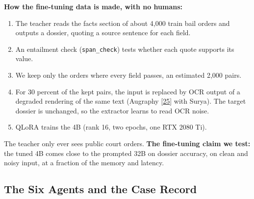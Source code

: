 \documentclass[10pt,a4paper]{article}
\newcommand{\st}[1]{\texttt{\small #1}}
\begin{document}
\textbf{How the fine-tuning data is made, with no humans:}

\begin{enumerate}
\item The teacher reads the facts section of about 4,000 train bail orders and outputs a dossier, quoting a source sentence for each field.
\item An entailment check (\st{span\_\allowbreak{}check}) tests whether each quote supports its value.
\item We keep only the orders where every field passes, an estimated 2,000 pairs.
\item For 30 percent of the kept pairs, the input is replaced by OCR output of a degraded rendering of the same text (Augraphy [\href{https://arxiv.org/abs/2208.14558}{25}] with Surya). The target dossier is unchanged, so the extractor learns to read OCR noise.
\item QLoRA trains the 4B (rank 16, two epochs, one RTX 2080 Ti).
\end{enumerate}

The teacher only ever sees public court orders. \textbf{The fine-tuning claim we test:} the tuned 4B comes close to the prompted 32B on dossier accuracy, on clean and noisy input, at a fraction of the memory and latency.

\subsection{The Six Agents and the Case Record}
\end{document}
